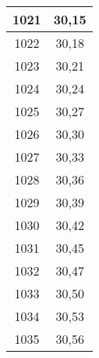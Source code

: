 \begin{table}[!ht]
\begin{tabular}{|c|c|}
    1021 & 30,15 \\ \hline
    1022 & 30,18 \\ \hline
    1023 & 30,21 \\ \hline
    1024 & 30,24 \\ \hline
    1025 & 30,27 \\ \hline
    1026 & 30,30 \\ \hline
    1027 & 30,33 \\ \hline
    1028 & 30,36 \\ \hline
    1029 & 30,39 \\ \hline
    1030 & 30,42 \\ \hline
    1031 & 30,45 \\ \hline
    1032 & 30,47 \\ \hline
    1033 & 30,50 \\ \hline
    1034 & 30,53 \\ \hline
    1035 & 30,56 \\ \hline
  \end{tabular}
\end{table}

\newpage

